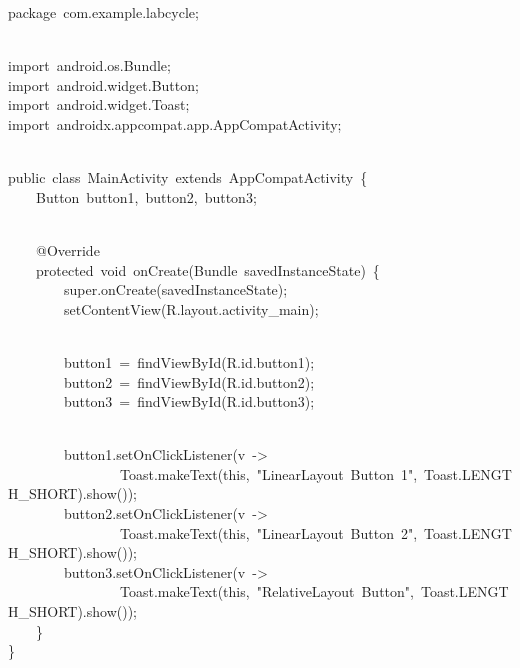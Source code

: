 {\ttfamily\small package\ com.example.labcycle;} \\
\strut \\
{\ttfamily\small import\ android.os.Bundle;} \\
{\ttfamily\small import\ android.widget.Button;} \\
{\ttfamily\small import\ android.widget.Toast;} \\
{\ttfamily\small import\ androidx.appcompat.app.AppCompatActivity;} \\
\strut \\
{\ttfamily\small public\ class\ MainActivity\ extends\ AppCompatActivity\ \{} \\
{\ttfamily\small \ \ \ \ Button\ button1,\ button2,\ button3;} \\
\strut \\
{\ttfamily\small \ \ \ \ @Override} \\
{\ttfamily\small \ \ \ \ protected\ void\ onCreate(Bundle\ savedInstanceState)\ \{} \\
{\ttfamily\small \ \ \ \ \ \ \ \ super.onCreate(savedInstanceState);} \\
{\ttfamily\small \ \ \ \ \ \ \ \ setContentView(R.layout.activity\_main);} \\
\strut \\
{\ttfamily\small \ \ \ \ \ \ \ \ button1\ =\ findViewById(R.id.button1);} \\
{\ttfamily\small \ \ \ \ \ \ \ \ button2\ =\ findViewById(R.id.button2);} \\
{\ttfamily\small \ \ \ \ \ \ \ \ button3\ =\ findViewById(R.id.button3);} \\
\strut \\
{\ttfamily\small \ \ \ \ \ \ \ \ button1.setOnClickListener(v\ -\textgreater{}} \\
{\ttfamily\small \ \ \ \ \ \ \ \ \ \ \ \ \ \ \ \ Toast.makeText(this,\ "LinearLayout\ Button\ 1",\ Toast.LENGTH\_SHORT).show());} \\
{\ttfamily\small \ \ \ \ \ \ \ \ button2.setOnClickListener(v\ -\textgreater{}} \\
{\ttfamily\small \ \ \ \ \ \ \ \ \ \ \ \ \ \ \ \ Toast.makeText(this,\ "LinearLayout\ Button\ 2",\ Toast.LENGTH\_SHORT).show());} \\
{\ttfamily\small \ \ \ \ \ \ \ \ button3.setOnClickListener(v\ -\textgreater{}} \\
{\ttfamily\small \ \ \ \ \ \ \ \ \ \ \ \ \ \ \ \ Toast.makeText(this,\ "RelativeLayout\ Button",\ Toast.LENGTH\_SHORT).show());} \\
{\ttfamily\small \ \ \ \ \}} \\
{\ttfamily\small \}} \\
